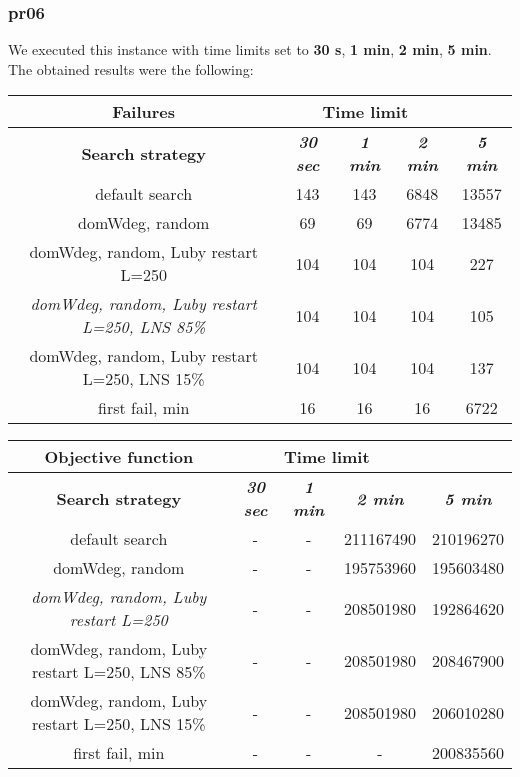 \subsubsection{pr06}
We executed this instance with time limits set to \textbf{30 s}, \textbf{1 min}, \textbf{2 min}, \textbf{5 min}.\\
The obtained results were the following:
{
\renewcommand{\arraystretch}{2}
\begin{longtable}[h]{| c | c | c | c | c |}
    \hline
    \textbf{Failures} & \multicolumn{3}{c}{Time limit} & \\
    \hline
    \textbf{Search strategy} & \textbf{\textit{30 sec}} & \textbf{\textit{1 min}} & \textbf{\textit{2 min}} & \textbf{\textit{5 min}} \\
    \hline
    \endhead
    default search                                         & 143 &  143 &  6848 & 13557 \\
    \hline
    domWdeg, random                                        &  69 &   69 &  6774 & 13485 \\
    \hline
    domWdeg, random, Luby restart L=250                    & 104 &  104 &  104 &    227 \\
    \hline
    \textit{domWdeg, random, Luby restart L=250, LNS 85\%} & 104 &  104 &  104 &    105 \\
    \hline
    domWdeg, random, Luby restart L=250, LNS 15\%          & 104 &  104 &  104 &    137 \\
    \hline
    first fail, min                                        &  16 &   16 &   16 &   6722 \\
    \hline
\end{longtable}
}

{
\renewcommand{\arraystretch}{2}
\begin{longtable}[h]{| c | c | c | c | c |}
    \hline
    \textbf{Objective function} & \multicolumn{3}{c}{Time limit} & \\
    \hline
    \textbf{Search strategy} & \textbf{\textit{30 sec}} & \textbf{\textit{1 min}} & \textbf{\textit{2 min}} & \textbf{\textit{5 min}} \\
    \hline
    \endhead
    default search                                & - & - & 211167490 & 210196270 \\
    \hline
    domWdeg, random                               & - & - & 195753960 & 195603480 \\
    \hline
    \textit{domWdeg, random, Luby restart L=250}  & - & - & 208501980 & 192864620 \\
    \hline
    domWdeg, random, Luby restart L=250, LNS 85\% & - & - & 208501980 & 208467900 \\
    \hline
    domWdeg, random, Luby restart L=250, LNS 15\% & - & - & 208501980 & 206010280 \\
    \hline
    first fail, min                               & - & - &         - & 200835560 \\
    \hline
\end{longtable}
}